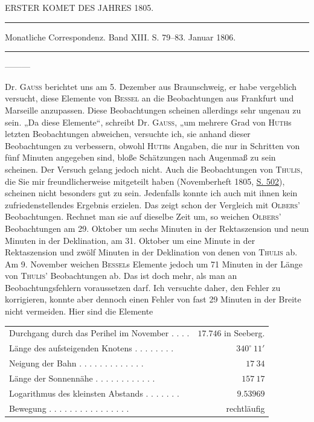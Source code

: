 \begin{center}
ERSTER KOMET DES JAHRES 1805.

\rule{0.6\linewidth}{0.4pt}

Monatliche Correspondenz. Band XIII. S. 79–83. Januar 1806.

\rule{0.6\linewidth}{0.4pt}

—\quad—\quad—
\end{center}

Dr. \textsc{Gauss} berichtet uns am 5. Dezember aus Braunschweig, er habe vergeblich versucht, diese Elemente von \textsc{Bessel} an die Beobachtungen aus Frankfurt und Marseille anzupassen. Diese Beobachtungen scheinen allerdings sehr ungenau zu sein. „Da diese Elemente“, schreibt Dr. \textsc{Gauss}, „um mehrere Grad von \textsc{Huth}s letzten Beobachtungen abweichen, versuchte ich, sie anhand dieser Beobachtungen zu verbessern, obwohl \textsc{Huth}s Angaben, die nur in Schritten von fünf Minuten angegeben sind, bloße Schätzungen nach Augenmaß zu sein scheinen. Der Versuch gelang jedoch nicht. Auch die Beobachtungen von \textsc{Thulis}, die Sie mir freundlicherweise mitgeteilt haben (Novemberheft 1805, \href{https://www.digitale-sammlungen.de/en/view/bsb10538604?page=518}{S. 502}), scheinen nicht besonders gut zu sein. Jedenfalls konnte ich auch mit ihnen kein zufriedenstellendes Ergebnis erzielen. Das zeigt schon der Vergleich mit \textsc{Olbers}’ Beobachtungen. Rechnet man sie auf dieselbe Zeit um, so weichen \textsc{Olbers}’ Beobachtungen am 29. Oktober um sechs Minuten in der Rektaszension und neun Minuten in der Deklination, am 31. Oktober um eine Minute in der Rektaszension und zwölf Minuten in der Deklination von denen von \textsc{Thulis} ab. Am 9. November weichen \textsc{Bessel}s Elemente jedoch um 71 Minuten in der Länge von \textsc{Thulis}’ Beobachtungen ab. Das ist doch mehr, als man an Beobachtungsfehlern voraussetzen darf. Ich versuchte daher, den Fehler zu korrigieren, konnte aber dennoch einen Fehler von fast 29 Minuten in der Breite nicht vermeiden. Hier sind die Elemente

\begin{center}
\begingroup\fontsize{8}{10}\selectfont\setlength{\tabcolsep}{3pt}\renewcommand{\arraystretch}{1.1}
\begin{tabular}{lr}
Durchgang durch das Perihel im November . . . . & $17.746$ in Seeberg. \\
Länge des aufsteigenden Knotens . . . . . . . . & $340^\circ\ 11'$ \\
Neigung der Bahn . . . . . . . . . . . . . & $17\ 34$ \\
Länge der Sonnennähe . . . . . . . . . . . . & $157\ 17$ \\
Logarithmus des kleinsten Abstands . . . . . . . & $9.53969$ \\
Bewegung . . . . . . . . . . . . . . . . & rechtläufig \\
\end{tabular}\endgroup
\end{center}

